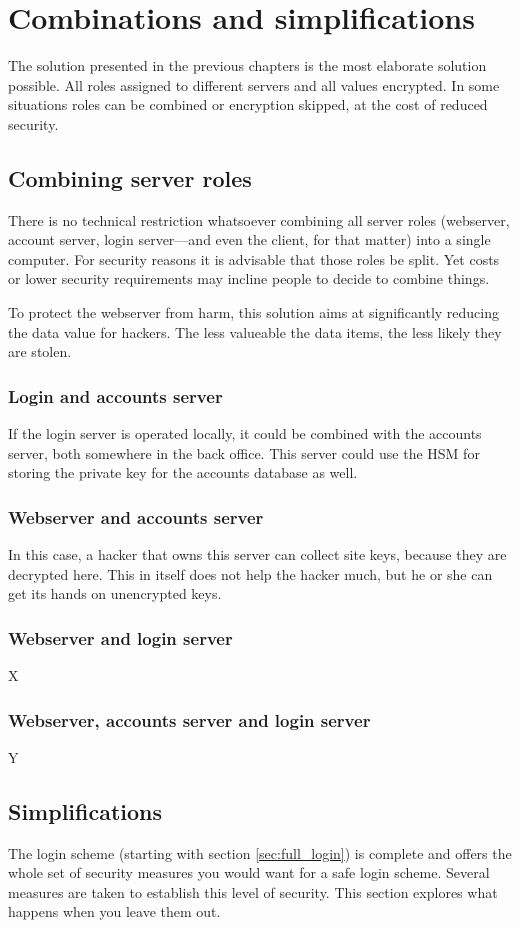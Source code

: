 \section{Combinations and simplifications}
The solution presented in the previous chapters is the most elaborate solution possible.
All roles assigned to different servers and all values encrypted.
In some situations roles can be combined or encryption skipped,
at the cost of reduced security.
\subsection{Combining server roles}
There is no technical restriction whatsoever combining all server roles
(webserver, account server, login server---and even the client, for that matter)
into a single computer.
For security reasons it is advisable that those roles be split.
Yet costs or lower security requirements may incline people to decide to combine things.
\par
To protect the webserver from harm,
this solution aims at significantly reducing the data value for hackers.
The less valueable the data items,
the less likely they are stolen.
\subsubsection{Login and accounts server}
\label{sec:login+accounts}
If the login server is operated locally,
it could be combined with the accounts server,
both somewhere in the back office.
This server could use the HSM for storing the private key for the accounts database as well.
\subsubsection{Webserver and accounts server}
In this case, a hacker that owns this server can collect site keys,
because they are decrypted here.
This in itself does not help the hacker much,
but he or she can get its hands on unencrypted keys.
\subsubsection{Webserver and login server}
X
\subsubsection{Webserver, accounts server and login server}
Y

\subsection{Simplifications}
The login scheme
(starting with section \vref{sec:full_login})
is complete and offers the whole set of security measures you would want for a safe login scheme.
Several measures are taken to establish this level of security.
This section explores what happens when you leave them out.
